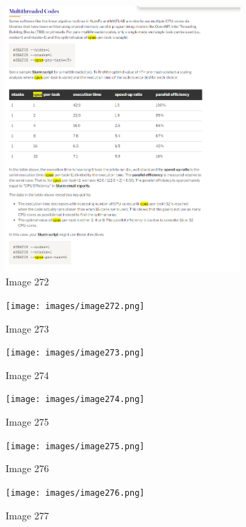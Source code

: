 \documentclass{article}%
\begin{document}
%


\begin{figure}[h!]%
\centering%
\includegraphics[width=0.8\textwidth]{images/image271.png}%
\caption{Image 272}%
\end{figure}

%


\begin{figure}[h!]%
\centering%
\texttt{[image: images/image272.png]}%
\caption{Image 273}%
\end{figure}

%


\begin{figure}[h!]%
\centering%
\texttt{[image: images/image273.png]}%
\caption{Image 274}%
\end{figure}

%


\begin{figure}[h!]%
\centering%
\texttt{[image: images/image274.png]}%
\caption{Image 275}%
\end{figure}

%


\begin{figure}[h!]%
\centering%
\texttt{[image: images/image275.png]}%
\caption{Image 276}%
\end{figure}

%


\begin{figure}[h!]%
\centering%
\texttt{[image: images/image276.png]}%
\caption{Image 277}%
\end{figure}
\end{document}
